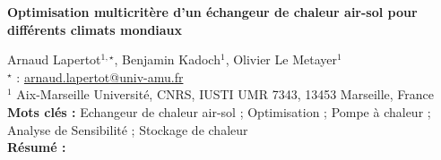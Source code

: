 


    \newpage


%
\begin{flushleft}
\addtocounter{section}{1}
{\Large \textbf{Optimisation multicritère d'un échangeur de chaleur air-sol pour différents climats mondiaux}}\label{ref:33}
\end{flushleft}
%
Arnaud Lapertot$^{1,\star}$, Benjamin Kadoch$^{1}$, Olivier Le Metayer$^{1}$\\[2mm]
$^{\star}$ \Letter : \url{arnaud.lapertot@univ-amu.fr}\\[2mm]
{\footnotesize $^{1}$ Aix-Marseille Université, CNRS, IUSTI UMR 7343, 13453 Marseille, France}\\
[4mm]
%
\noindent \textbf{Mots clés : } Echangeur de chaleur air-sol ; Optimisation ; Pompe à chaleur ; Analyse de Sensibilité ; Stockage de chaleur\\[4mm]
%
\noindent \textbf{Résumé : } 

